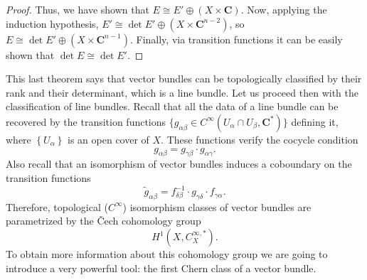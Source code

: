 \documentclass[12pt,a4paper]{book}
\theoremstyle{definition} \newtheorem{defn}[thm]{Definition}
\theoremstyle{definition} \newtheorem{ejemplo}[thm]{Example}
\theoremstyle{remark} \newtheorem{rem}[thm]{Remark}
\def\CC{\mathbf{C}}
\begin{document}
\begin{proof}
     Thus, we have shown that $E\cong E'\oplus (X\times \CC)$. Now, applying the induction hypothesis, $E'\cong \det E' \oplus (X\times \CC^{n-2})$, so $E\cong \det E' \oplus (X\times \CC^{n-1})$. Finally, via transition functions it can be easily shown that $\det E \cong \det E'$.
\end{proof}

This last theorem says that vector bundles can be topologically classified by their rank and their determinant, which is a line bundle. Let us proceed then with the classification of line bundles. Recall that all the data of a line bundle can be recovered by the transition functions $\{g_{\alpha \beta}\in C^\infty(U_\alpha \cap U_\beta , \CC^*)\}$ defining it, where $\left\{ U_\alpha \right\}$ is an open cover of $X$. These functions verify the cocycle condition $$g_{\alpha \beta}=g_{\gamma \beta}\cdot g_{\alpha \gamma}.$$ Also recall that an isomorphism of vector bundles induces a coboundary on the transition functions
\begin{equation*}
  \tilde{g}_{\alpha\beta}=f^{-1}_{\delta\beta}\cdot g_{\gamma\delta} \cdot f_{\gamma\alpha}.
\end{equation*}
Therefore, topological ($C^\infty$) isomorphism classes of vector bundles are parametrized by the \v{C}ech cohomology group
\begin{equation*}
  H^1(X,C^{\infty,*}_X).
\end{equation*}
To obtain more information about this cohomology group we are going to introduce a very powerful tool: the first Chern class of a vector bundle.
\end{document}
